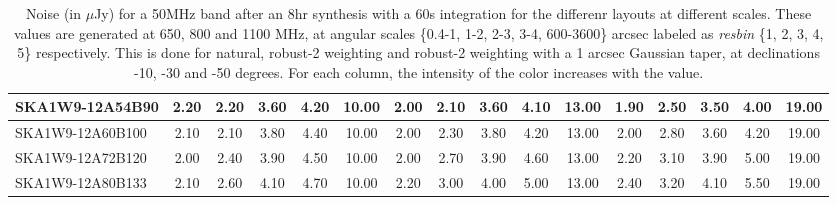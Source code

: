 \begin{table}[H]
{{\begin{tabular}{|lccccc||ccccc||ccccc|}
SKA1W9-12A54B90 & 2.20 \cellcolor{blue!28.50} & 2.20 \cellcolor{red!21.23} & 3.60 \cellcolor{green!18.00} & 4.20 \cellcolor{orange!18.00} & 10.00 \cellcolor{purple!60.00} & 2.00 \cellcolor{blue!18.00} & 2.10 \cellcolor{red!18.00} & 3.60 \cellcolor{green!18.00} & 4.10 \cellcolor{orange!18.00} & 13.00 \cellcolor{purple!18.00} & 1.90 \cellcolor{blue!18.00} & 2.50 \cellcolor{red!18.00} & 3.50 \cellcolor{green!18.00} & 4.00 \cellcolor{orange!18.00} & 19.00 \cellcolor{purple!60.00}\\ \hline 
SKA1W9-12A60B100 & 2.10 \cellcolor{blue!23.25} & 2.10 \cellcolor{red!18.00} & 3.80 \cellcolor{green!27.33} & 4.40 \cellcolor{orange!34.80} & 10.00 \cellcolor{purple!60.00} & 2.00 \cellcolor{blue!18.00} & 2.30 \cellcolor{red!24.00} & 3.80 \cellcolor{green!30.00} & 4.20 \cellcolor{orange!22.67} & 13.00 \cellcolor{purple!18.00} & 2.00 \cellcolor{blue!22.67} & 2.80 \cellcolor{red!32.00} & 3.60 \cellcolor{green!25.00} & 4.20 \cellcolor{orange!23.60} & 19.00 \cellcolor{purple!60.00}\\ \hline 
SKA1W9-12A72B120 & 2.00 \cellcolor{blue!18.00} & 2.40 \cellcolor{red!27.69} & 3.90 \cellcolor{green!32.00} & 4.50 \cellcolor{orange!43.20} & 10.00 \cellcolor{purple!60.00} & 2.00 \cellcolor{blue!18.00} & 2.70 \cellcolor{red!36.00} & 3.90 \cellcolor{green!36.00} & 4.60 \cellcolor{orange!41.33} & 13.00 \cellcolor{purple!18.00} & 2.20 \cellcolor{blue!32.00} & 3.10 \cellcolor{red!46.00} & 3.90 \cellcolor{green!46.00} & 5.00 \cellcolor{orange!46.00} & 19.00 \cellcolor{purple!60.00}\\ \hline 
SKA1W9-12A80B133 & 2.10 \cellcolor{blue!23.25} & 2.60 \cellcolor{red!34.15} & 4.10 \cellcolor{green!41.33} & 4.70 \cellcolor{orange!60.00} & 10.00 \cellcolor{purple!60.00} & 2.20 \cellcolor{blue!28.50} & 3.00 \cellcolor{red!45.00} & 4.00 \cellcolor{green!42.00} & 5.00 \cellcolor{orange!60.00} & 13.00 \cellcolor{purple!18.00} & 2.40 \cellcolor{blue!41.33} & 3.20 \cellcolor{red!50.67} & 4.10 \cellcolor{green!60.00} & 5.50 \cellcolor{orange!60.00} & 19.00 \cellcolor{purple!60.00}\\ \hline 
\end{tabular}}
\vspace{-0.300000cm}
\hspace{1cm} 

\vspace{.25cm}
\caption{Noise (in $\mu$Jy) for a 50MHz band after an 8hr synthesis with a 60s integration for the differenr layouts at different scales. These values are generated at 650, 800 and 1100 MHz, at angular scales \{0.4-1, 1-2, 2-3, 3-4, 600-3600\} arcsec labeled as {\it resbin} \{1, 2, 3, 4, 5\} respectively. This is done for natural, robust-2 weighting and robust-2 weighting with a 1 arcsec Gaussian taper, at declinations -10, -30 and -50 degrees. For each column, the intensity of the color increases with the value.}\label{tab:noise50}}
 \end{table}
